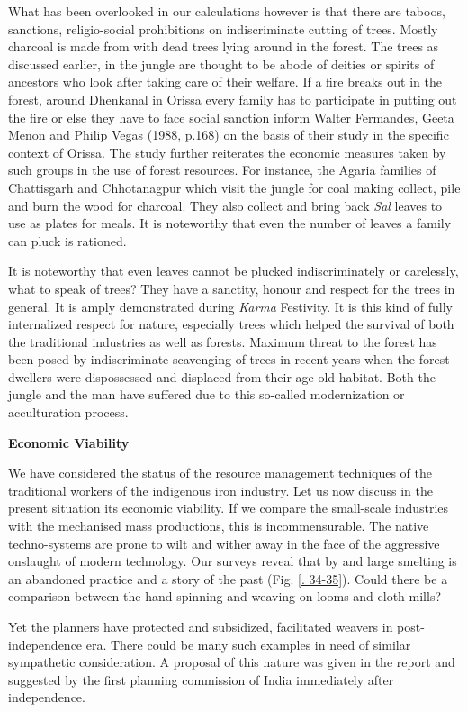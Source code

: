 What has been overlooked in our calculations however is that there are taboos, sanctions, religio-social prohibitions on indiscriminate cutting of trees. Mostly charcoal is made from with dead trees lying around in the forest. The trees as discussed earlier, in the jungle are thought to be abode of deities or spirits of ancestors who look after taking care of their welfare. If a fire breaks out in the forest, around Dhenkanal in Orissa every family has to participate in putting out the fire or else they have to face social sanction inform Walter Fermandes, Geeta Menon and Philip Vegas (1988, p.168) on the basis of their study in the specific context of Orissa. The study further reiterates the economic measures taken by such groups in the use of forest resources. For instance, the Agaria families of Chattisgarh and Chhotanagpur which visit the jungle for coal making collect, pile and burn the wood for charcoal. They also collect and bring back {\it Sal} leaves to use as plates for meals. It is noteworthy that even the number of leaves a family can pluck is rationed. 

It is noteworthy that even leaves cannot be plucked indiscriminately or carelessly, what to speak of trees? They have a sanctity, honour and respect for the trees in general. It is amply demonstrated during {\it Karma} Festivity. It is this kind of fully internalized respect for nature, especially trees which helped the survival of both the traditional industries as well as forests. Maximum threat to the forest has been posed by indiscriminate scavenging of trees in recent years when the forest dwellers were dispossessed and displaced from their age-old habitat. Both the jungle and the man have suffered due to this so-called modernization or acculturation process.

\noindent \textbf{\large Economic Viability}

We have considered the status of the resource management techniques of the traditional workers of the indigenous iron industry. Let us now discuss in the present situation its economic viability. If we compare the small-scale industries with the mechanised mass productions, this is incommensurable. The native techno-systems are prone to wilt and wither away in the face of the aggressive onslaught of modern technology. Our surveys reveal that by and large smelting is an abandoned practice and a story of the past (Fig. \ref{. 34-35}). Could there be a comparison between the hand spinning and weaving on looms and cloth mills?

Yet the planners have protected and subsidized, facilitated weavers in post-independence era. There could be many such examples in need of similar sympathetic consideration. A proposal of this nature was given in the report and suggested by the first planning commission of India immediately after independence.  

